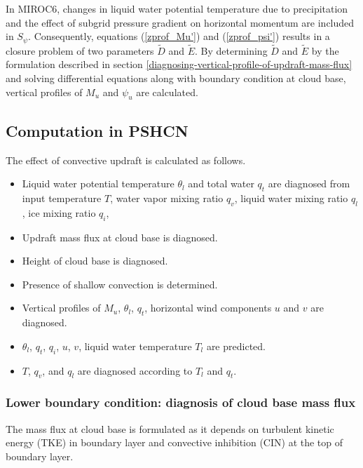 \documentclass[platex, dvipdfmx]{article}
\begin{document}
In MIROC6, changes in liquid water potential temperature due to precipitation and the effect of subgrid pressure gradient on horizontal momentum are included in $S_{\psi}$.
Consequently, equations (\ref{zprof_Mu'}) and (\ref{zprof_psi'}) results in a closure problem of two parameters $\tilde{D}$ and $\tilde{E}$.
By determining $\tilde{D}$ and $\tilde{E}$ by the formulation described in section \ref{diagnosing-vertical-profile-of-updraft-mass-flux} 
and solving differential equations along with boundary condition at cloud base, vertical profiles of $M_u$ and $\psi_u$ are calculated.

\subsection{Computation in PSHCN}\label{computation-in-PSHCN}

The effect of convective updraft is calculated as follows.
\begin{itemize}
    \item Liquid water potential temperature $\theta_l$ and total water $q_t$ are diagnosed from input temperature $T$, water vapor mixing ratio $q_v$, liquid water mixing ratio $q_l$, ice mixing ratio $q_i$, 
    \item Updraft mass flux at cloud base is diagnosed.
    \item Height of cloud base is diagnosed.
    \item Presence of shallow convection is determined.
    \item Vertical profiles of $M_u$, $\theta_l$, $q_t$, horizontal wind components $u$ and $v$ are diagnosed.
    \item $\theta_l$, $q_t$, $q_i$, $u$, $v$, liquid water temperature $T_l$ are predicted.
    \item $T$, $q_v$, and $q_l$ are diagnosed according to $T_l$ and $q_t$.
\end{itemize}

\subsubsection{Lower boundary condition: diagnosis of cloud base mass flux}\label{lower-boundary-condition}
The mass flux at cloud base is formulated as it depends on turbulent kinetic energy (TKE) in boundary layer and convective inhibition (CIN) at the top of boundary layer.
\end{document}
